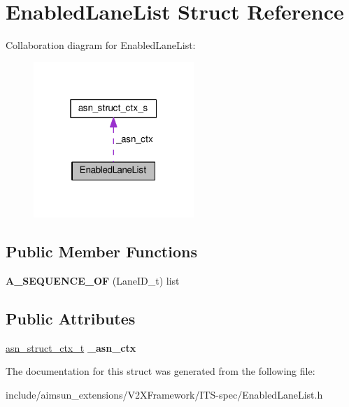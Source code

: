 \hypertarget{structEnabledLaneList}{}\section{Enabled\+Lane\+List Struct Reference}
\label{structEnabledLaneList}


Collaboration diagram for Enabled\+Lane\+List\+:\nopagebreak
\begin{figure}[H]
\begin{center}
\leavevmode
\includegraphics[width=172pt]{structEnabledLaneList__coll__graph}
\end{center}
\end{figure}
\subsection*{Public Member Functions}
\begin{DoxyCompactItemize}
\item 
{\bfseries A\+\_\+\+S\+E\+Q\+U\+E\+N\+C\+E\+\_\+\+OF} (Lane\+I\+D\+\_\+t) list\hypertarget{structEnabledLaneList_a48471ae9d0d5af747f7832624fce6204}{}\label{structEnabledLaneList_a48471ae9d0d5af747f7832624fce6204}

\end{DoxyCompactItemize}
\subsection*{Public Attributes}
\begin{DoxyCompactItemize}
\item 
\hyperlink{structasn__struct__ctx__s}{asn\+\_\+struct\+\_\+ctx\+\_\+t} {\bfseries \+\_\+asn\+\_\+ctx}\hypertarget{structEnabledLaneList_a03e76a2fe2c6cff69642efded50a2b43}{}\label{structEnabledLaneList_a03e76a2fe2c6cff69642efded50a2b43}

\end{DoxyCompactItemize}


The documentation for this struct was generated from the following file\+:\begin{DoxyCompactItemize}
\item 
include/aimsun\+\_\+extensions/\+V2\+X\+Framework/\+I\+T\+S-\/spec/Enabled\+Lane\+List.\+h\end{DoxyCompactItemize}
